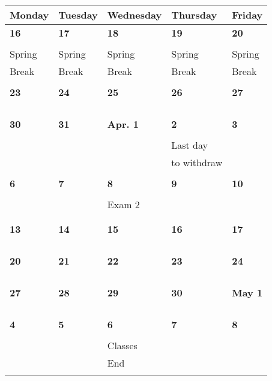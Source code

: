 \documentclass[letter, 12pt]{article}
\begin{document}
\newpage
\begin{center}
\begin{tabular}{|l|l|l|l|l|}
\hline
{\bf \phantom{xx}Monday\phantom{x}} & {\bf \phantom{xx}Tuesday\phantom{x}} & {\bf \phantom{x}Wednesday\phantom{}} & {\bf \phantom{x}Thursday\phantom{x}} & {\bf \phantom{xx}Friday\phantom{xx}} \\
\hline
\textbf{16}&\textbf{17}&\textbf{18}&\textbf{19}&\textbf{20}\\
&  &  &  & \\
Spring &Spring  &Spring  &Spring  &Spring \\
Break &Break  &Break  &Break &Break \\
&  &  &  & \\
\hline
\textbf{23}&\textbf{24}&\textbf{25}&\textbf{26}&\textbf{27}\\
&  &  &  & \\
&  &  &  & \\
&  &  &  & \\
&  &  &  & \\
\hline
\textbf{30}&\textbf{31}&\textbf{Apr. 1}&\textbf{2}&\textbf{3}\\
&  &  &  & \\
&  &  &Last day  & \\
&  &  & to withdraw & \\
&  &  &  & \\
\hline
\textbf{6}&\textbf{7}&\textbf{8}&\textbf{9}&\textbf{10}\\
&  &  &  & \\
&  & Exam 2 &  & \\
&  &  &  & \\
&  &  &  & \\
\hline
\textbf{13}&\textbf{14}&\textbf{15}&\textbf{16}&\textbf{17}\\
&  &  &  & \\
&  &  &  & \\
&  &  &  & \\
&  &  &  & \\
\hline
\textbf{20}&\textbf{21}&\textbf{22}&\textbf{23}&\textbf{24}\\
&  &  &  & \\
&  &  &  & \\
&  &  &  & \\
&  &  &  & \\
\hline
\textbf{27}&\textbf{28}&\textbf{29}&\textbf{30}&\textbf{May 1}\\
&  &  &  & \\
&  &  &  & \\
&  &  &  & \\
&  &  &  & \\
\hline
\textbf{4}&\textbf{5}&\textbf{6}&\textbf{7}&\textbf{8}\\
&  &  &  & \\
&  &Classes   &  & \\
&  & End &  & \\
&  &  &  & \\
\hline
\end{tabular}
\end{center}
\end{document}
